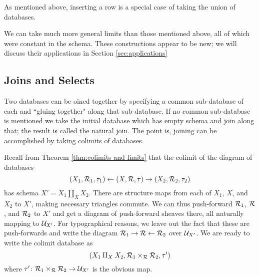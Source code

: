\documentclass{amsart}
\begin{document}
As mentioned above, inserting a row is a special case of taking the union of databases.

We can take much more general limits than those mentioned above, all of which were constant in the schema.  These constructions appear to be new; we will discuss their applications in Section \ref{sec:applications} 

\subsection{Joins and Selects}\label{subsec:joins}

Two databases can be oined together by specifying a common sub-database of each and ``gluing together" along that sub-database.  If no common sub-database is mentioned we take the initial database which has empty schema and join along that; the result is called the natural join.  The point is, joining can be accomplished by taking colimits of databases.

Recall from Theorem \ref{thm:colimits and limits} that the colimit of the diagram of databases $$(X_1,\mathcal{R}_1,\tau_1)\leftarrow(X,\mathcal{R},\tau)\rightarrow(X_2,\mathcal{R}_2,\tau_2)$$ has schema $X'=X_1\amalg_XX_2$.  There are structure maps from each of $X_1$, $X$, and $X_2$ to $X'$, making necessary triangles commute.  We can thus push-forward $\mathcal{R}_1$, $\mathcal{R}$, and $\mathcal{R}_2$ to $X'$ and get a diagram of push-forward sheaves there, all naturally mapping to $\mathcal{U}_{X'}$.  For typographical reasons, we leave out the fact that these are push-forwards and write the diagram $\mathcal{R}_1\rightarrow\mathcal{R}\leftarrow\mathcal{R}_2$ over $\mathcal{U}_{X'}$.  We are ready to write the colimit database as $$(X_1\amalg_XX_2,\mathcal{R}_1\times_\mathcal{R}\mathcal{R}_2,\tau')$$ where $\tau'\colon\mathcal{R}_1\times_\mathcal{R}\mathcal{R}_2\rightarrow\mathcal{U}_{X'}$ is the obvious map.
\end{document}
